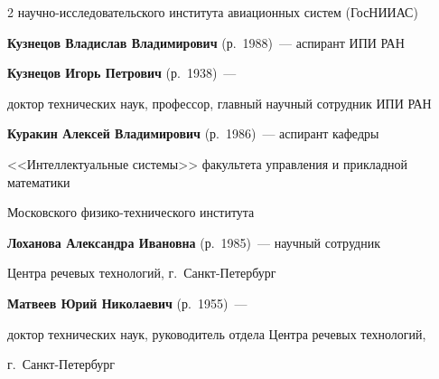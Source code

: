 \begin{multicols}{2}
научно-исследовательского института авиационных систем (ГосНИИАС)



\vspace*{4pt}





\noindent

\textbf{Кузнецов Владислав Владимирович} (р.\ 1988)~--- аспирант ИПИ РАН 



\vspace*{4pt}



\noindent

\textbf{Кузнецов Игорь Петрович} (р.\ 1938)~--- 

доктор технических наук, профессор, главный научный сотрудник ИПИ РАН



\vspace*{4pt}



\noindent

\textbf{Куракин Алексей Владимирович} (р.\ 1986)~--- аспирант кафедры 

<<Интеллектуальные системы>> факультета управления и прикладной математики 

Московского физико-технического института



\vspace*{4pt}



\noindent

\textbf{Лоханова Александра Ивановна} (р.\ 1985)~--- научный сотрудник 

Центра речевых технологий, г.~Санкт-Пе\-тер\-бург



\vspace*{4pt}



\noindent

\textbf{Матвеев Юрий Николаевич} (р.\ 1955)~--- 

доктор технических наук, руководитель отдела Центра речевых технологий, 

г.~Санкт-Пе\-тер\-бург



\vspace*{4pt}



\noindent


\end{multicols}
